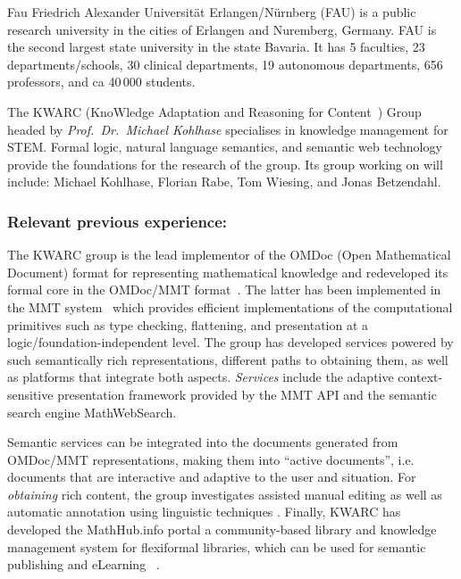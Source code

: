 \begin{sitedescription}{Fau}
  Friedrich Alexander Universit\"at Erlangen/N\"urnberg (FAU) is a public research
  university in the cities of Erlangen and Nuremberg, Germany. FAU is the second largest
  state university in the state Bavaria. It has 5 faculties, 23 departments/schools, 30
  clinical departments, 19 autonomous departments, 656 professors, and ca 40\,000
  students.

  The KWARC (KnoWledge Adaptation and Reasoning for Content~\cite{KWARC:on}) Group
  headed by {\emph{Prof.\ Dr.\ Michael Kohlhase}} specialises in knowledge management for
  STEM.  Formal logic, natural language semantics, and semantic web technology provide the
  foundations for the research of the group. Its group working on \pn will include: Michael
  Kohlhase, Florian Rabe, Tom Wiesing, and Jonas Betzendahl.

% 
% 
% 

\subsubsection*{Relevant previous experience:}

The KWARC group is the lead implementor of the OMDoc (Open Mathematical Document) format
for representing mathematical knowledge \cite{Kohlhase:OMDoc1.2} and redeveloped its
formal core in the OMDoc/MMT format~\cite{RabKoh:WSMSML13}. The latter has been
implemented in the MMT system~\cite{MMTSVN:on,RabKoh:WSMSML13} which provides efficient
implementations of the computational primitives such as type checking, flattening, and
presentation at a logic/foundation-independent level.  The group has developed services
powered by such semantically rich representations, different paths to obtaining them, as
well as platforms that integrate both aspects.  \emph{Services} include the adaptive
context-sensitive presentation framework provided by the MMT API and the semantic search
engine MathWebSearch\cite{KohSuc:asemf06,ProKoh:mwssofse12}. 

Semantic services can be integrated into the documents generated from OMDoc/MMT
representations, making them into ``active documents'', i.e. documents that are
interactive and adaptive to the user and situation.  For \emph{obtaining} rich content,
the group investigates assisted manual editing \cite{JucKoh:sidesc10:biblatex} as well as
automatic annotation using linguistic techniques \cite{GinJucAnc:alsaacl09}.  Finally,
KWARC has developed the \textsf{MathHub.info} portal a community-based library and
knowledge management system for flexiformal libraries, which can be used for semantic
publishing and eLearning~ \cite{KohDavGin:psewads11,MathHub:on,IanJucKoh:sdm14}.


\end{sitedescription}
